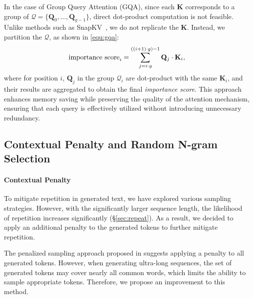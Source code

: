 In the case of Group Query Attention (GQA), since each $\mathbf{K}$ corresponds to a group of $\mathcal{Q}=\{\mathbf{Q}_0, ..., \mathbf{Q}_{g-1}\}$, direct dot-product computation is not feasible. Unlike methods such as SnapKV~\citep{snapkv}, we do not replicate the $\mathbf{K}$. Instead, we partition the $\mathcal{Q}$, as shown in \cref{equ:gqa}:
\begin{equation}
    \label{equ:gqa}
    \vspace{-2mm}
    \text{importance score}_i = \sum_{j=i\cdot g}^{((i+1)\cdot g)-1}\mathbf{Q}_j \cdot \mathbf{K}_i,
\end{equation}
where for position $i$, $\mathbf{Q}_j$ in the group $\mathcal{Q}_i$ are dot-product with the same $\mathbf{K}_i$, and their results are aggregated to obtain the final \textit{importance score}. This approach enhances memory saving while preserving the quality of the attention mechanism, ensuring that each query is effectively utilized without introducing unnecessary redundancy.

\subsection{Contextual Penalty and Random N-gram Selection}
\label{sec:penalty}
\paragraph{Contextual Penalty} 
To mitigate repetition in generated text, we have explored various sampling strategies. However, with the significantly larger sequence length, the likelihood of repetition increases significantly (\S \ref{sec:repeat}). As a result, we decided to apply an additional penalty to the generated tokens to further mitigate repetition.

The penalized sampling approach proposed in \citep{penalty} suggests applying a penalty to all generated tokens. However, when generating ultra-long sequences, the set of generated tokens may cover nearly all common words, which limits the ability to sample appropriate tokens. Therefore, we propose an improvement to this method. 

